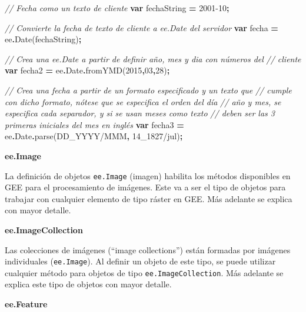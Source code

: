 \documentclass[
  12pt,
  letterpaper,
  twoside]{book}
\newenvironment{Shaded}{\begin{snugshade}}{\end{snugshade}}
\newcommand{\AttributeTok}[1]{\textcolor[rgb]{0.77,0.63,0.00}{#1}}
\newcommand{\CommentTok}[1]{\textcolor[rgb]{0.56,0.35,0.01}{\textit{#1}}}
\newcommand{\DecValTok}[1]{\textcolor[rgb]{0.00,0.00,0.81}{#1}}
\newcommand{\FunctionTok}[1]{\textcolor[rgb]{0.00,0.00,0.00}{#1}}
\newcommand{\KeywordTok}[1]{\textcolor[rgb]{0.13,0.29,0.53}{\textbf{#1}}}
\newcommand{\NormalTok}[1]{#1}
\newcommand{\OperatorTok}[1]{\textcolor[rgb]{0.81,0.36,0.00}{\textbf{#1}}}
\newcommand{\StringTok}[1]{\textcolor[rgb]{0.31,0.60,0.02}{#1}}
\begin{document}
\begin{Shaded}
\begin{Highlighting}[]
\CommentTok{// Fecha como un texto de cliente}
\KeywordTok{var}\NormalTok{ fechaString }\OperatorTok{=} \StringTok{\textquotesingle{}2001{-}10\textquotesingle{}}\OperatorTok{;}

\CommentTok{// Convierte la fecha de texto de cliente a ee.Date del servidor    }
\KeywordTok{var}\NormalTok{ fecha }\OperatorTok{=}\NormalTok{ ee}\OperatorTok{.}\FunctionTok{Date}\NormalTok{(fechaString)}\OperatorTok{;}  

\CommentTok{// Crea una ee.Date a partir de definir año, mes y dia con números del }
\CommentTok{// cliente           }
\KeywordTok{var}\NormalTok{ fecha2 }\OperatorTok{=}\NormalTok{ ee}\OperatorTok{.}\AttributeTok{Date}\OperatorTok{.}\FunctionTok{fromYMD}\NormalTok{(}\DecValTok{2015}\OperatorTok{,}\DecValTok{03}\OperatorTok{,}\DecValTok{28}\NormalTok{)}\OperatorTok{;} 
   
\CommentTok{// Crea una fecha a partir de un formato especificado y un texto que }
\CommentTok{// cumple con dicho formato, nótese que se especifica el orden del día }
\CommentTok{// año y mes, se especifica cada separador, y si se usan meses como texto}
\CommentTok{// deben ser las 3 primeras iniciales del mes en inglés}
\KeywordTok{var}\NormalTok{ fecha3 }\OperatorTok{=}\NormalTok{ ee}\OperatorTok{.}\AttributeTok{Date}\OperatorTok{.}\FunctionTok{parse}\NormalTok{(}\StringTok{\textquotesingle{}DD\_YYYY/MMM\textquotesingle{}}\OperatorTok{,} \StringTok{\textquotesingle{}14\_1827/jul\textquotesingle{}}\NormalTok{)}\OperatorTok{;} 
\end{Highlighting}
\end{Shaded}

\textbf{ee.Image}

La definición de objetos \texttt{ee.Image} (imagen) habilita los métodos disponibles en GEE para el procesamiento de imágenes. Este va a ser el tipo de objetos para trabajar con cualquier elemento de tipo ráster en GEE. Más adelante se explica con mayor detalle.

\textbf{ee.ImageCollection}

Las colecciones de imágenes (``image collections'') están formadas por imágenes individuales (\texttt{ee.Image}). Al definir un objeto de este tipo, se puede utilizar cualquier método para objetos de tipo \texttt{ee.ImageCollection}. Más adelante se explica este tipo de objetos con mayor detalle.

\textbf{ee.Feature}
\end{document}
